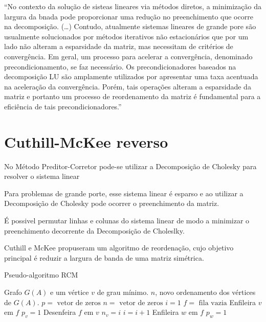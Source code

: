 ``No contexto da solução de sisteas lineares via métodos diretos, a
minimização da largura da bnada pode proporcionar uma redução no
preenchimento que ocorre na decomposição. (\ldots) Contudo, atualmente
sistemas lineares de grande pore são usualmente solucionados por métodos
iterativos não estacionários que por um lado não alteram a esparsidade da
matriz, mas necessitam de critérios de convergência. Em geral, um
processo para acelerar a convergência, denominado precondicionamento, se faz
necessário. Os precondicionadores baseados na decomposição LU são
amplamente utilizados por apresentar uma taxa acentuada na aceleração da
convergência. Porém, tais operações alteram a esparsidade da matriz e
portanto um processo de reordenamento da matriz é fundamental para a
eficiência de tais precondicionadores.''

\section{Cuthill-McKee reverso}
No Método Preditor-Corretor pode-se utilizar a Decomposição de Cholesky para resolver o sistema linear

Para problemas de grande porte, esse sistema linear é esparso e ao utilizar a Decomposição de Cholesky pode ocorrer o preenchimento da matriz.

É possivel permutar linhas e colunas do sistema linear de modo a minimizar o preenchimento decorrente da Decomposição de Choleslky.

Cuthill e McKee \cite{Cuthill:1969:ReducingBandwidth} propuseram um algoritmo de reordenação, cujo objetivo principal é reduzir a largura de banda de uma matriz simétrica.

\begin{algorithm}
    \caption{Pseudo-algoritmo RCM}
    \label{alg:rcm}
    \begin{algorithmic}
        \REQUIRE Grafo $G(A)$ e um vértice $v$ de grau mínimo.
        \ENSURE $n$, novo ordenamento dos vértices de $G(A)$.
        \STATE $p = \text{ vetor de zeros}$
        \STATE $n = \text{ vetor de zeros}$
        \STATE $i = 1$
        \STATE $f = \text{ fila vazia}$
        \STATE Enfileira $v$ em $f$
        \STATE $p_v = 1$
            \STATE Desenfeira $f$ em $v$
            \STATE $n_v = i$
            \STATE $i = i + 1$
                    \STATE Enfileira $w$ em $f$
                    \STATE $p_w = 1$
                \ENDIF
            \ENDFOR
        \ENDWHILE
    \end{algorithmic}
\end{algorithm}
